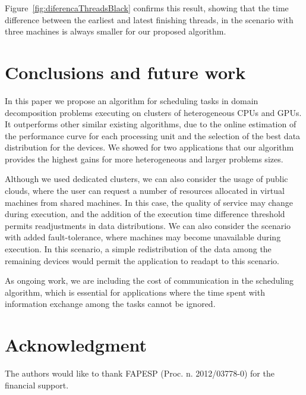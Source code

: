 \documentclass[journal]{IEEEtran}
\begin{document}
Figure~\ref{fig:diferencaThreadsBlack} confirms this result, showing that the
time difference between the earliest and latest finishing threads, in the
scenario with three machines is always smaller for our proposed algorithm.

\section{Conclusions and future work}

In this paper we propose an algorithm for scheduling tasks in domain
decomposition problems executing on clusters of heterogeneous CPUs and GPUs. It
outperforms other similar existing algorithms, due to the online estimation of
the performance curve for each processing unit and the selection of the best
data distribution for the devices. We showed for two applications that our
algorithm provides the highest gains for more heterogeneous and larger problems
sizes.

Although we used dedicated clusters, we can also consider the usage of public
clouds, where the user can request a number of resources allocated in virtual
machines from shared machines. In this case, the quality of service may change
during execution, and the addition of the execution time difference threshold
permits readjustments in data distributions. We can also consider the scenario
with added fault-tolerance, where machines may become unavailable during
execution. In this scenario, a simple redistribution of the data among the
remaining devices would permit the application to readapt to this scenario.

As ongoing work, we are including the cost of communication in the scheduling
algorithm, which is essential for applications where the time spent with
information exchange among the tasks cannot be ignored.

\section*{Acknowledgment}


The authors would like to thank FAPESP (Proc. n. 2012/03778-0) for the financial support.


\ifCLASSOPTIONcaptionsoff
  \newpage
\fi


%
%

\end{document}
